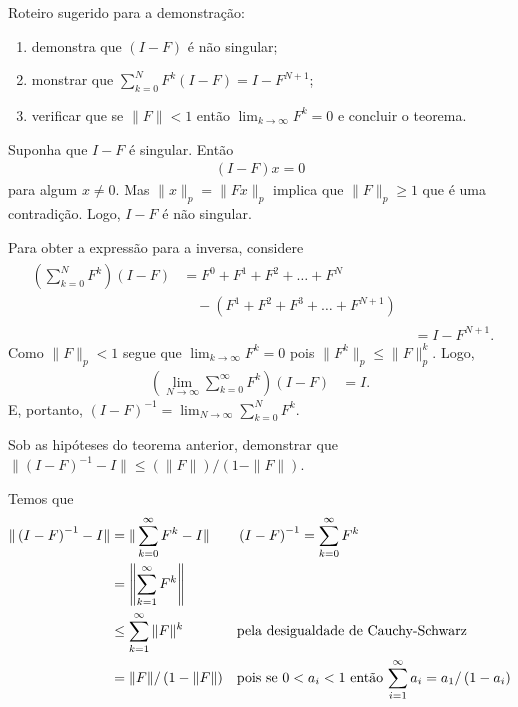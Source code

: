 \begin{questions}
    Roteiro sugerido para a demonstra\c{c}\~{a}o:
    \begin{enumerate}
        \item demonstra que $\left( I - F \right)$ \'{e} n\~{a}o singular;
        \item monstrar que $\sum_{k = 0}^N F^k \left( I - F \right) = I - F^{N + 1}$;
        \item verificar que se $\| F \| < 1$ ent\~{a}o $\lim_{k \rightarrow \infty} F^k = 0$ e concluir o teorema.
    \end{enumerate}
    \begin{solution}
        Suponha que $I - F$ \'{e} singular. Ent\~{a}o
        \begin{align*}
            \left( I - F \right) x = 0
        \end{align*}
        para algum $x \neq 0$. Mas $\| x \|_p = \| F x \|_p$ implica que $\| F \|_p \geq 1$ que \'{e} uma contradi\c{c}\~{a}o. Logo, $I - F$ \'{e} n\~{a}o singular.

        Para obter a express\~{a}o para a inversa, considere
        \begin{align*}
            \begin{split}
                \left( \sum_{k = 0}^N F^k \right) \left( I - F \right) &= F^0 + F^1 + F^2 + \ldots + F^N \\
                &\quad {}- \left( F^1 + F^2 + F^3 + \ldots + F^{N + 1} \right)
            \end{split} \\
            &= I - F^{N + 1}.
        \end{align*}
        Como $\| F \|_p < 1$ segue que $\lim_{k \to \infty} F^k = 0$ pois $\| F^k \|_p \leq \| F \|_p^k$. Logo,
        \begin{align*}
            \left( \lim_{N \to \infty} \sum_{k = 0}^\infty F^k \right) \left( I - F \right) &= I.
        \end{align*}
        E, portanto, $\left( I - F \right)^{-1} = \lim_{N \to \infty} \sum_{k = 0}^N F^k$.
    \end{solution}

    \question Sob as hip\'{o}teses do teorema anterior, demonstrar que $\| \left( I - F \right)^{-1} - I \| \leq \left( \| F \| \right) / \left( 1 - \| F \| \right)$.
    \begin{solution}
        Temos que
        \begin{align*}
            \| \left( I - F \right)^{-1} - I \| &= \| \sum_{k = 0}^\infty F^k - I \| && \left( I - F \right)^{-1} = \sum_{k = 0}^\infty F^k \\
            &= \left\| \sum_{k = 1}^\infty F^{k} \right\| \\
            &\leq \sum_{k = 1}^\infty \| F \|^k  && \text{pela desigualdade de Cauchy-Schwarz} \\
            &= \| F \| / \left( 1 - \| F \| \right) && \text{pois se $ 0 < a_i < 1$ ent\~{a}o $\sum_{i = 1}^\infty a_i = a_1 / \left( 1 - a_i \right)$} \\
        \end{align*}
    \end{solution}


\end{questions}
